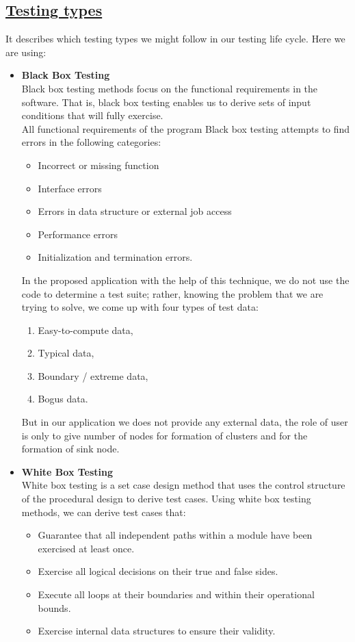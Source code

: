 \subsection*{\underline{Testing types}}
It describes which testing types we might follow in our testing life cycle. Here we are using:
\begin{itemize}
\item \textbf{Black Box Testing}\\
Black box testing methods focus on the functional requirements in the software. That is, black box testing enables us to derive sets of input conditions that will fully exercise.\\
All functional requirements of the program Black box testing attempts to find errors in the following categories:
\begin{itemize}
\item Incorrect or missing function
\item	Interface errors
\item	Errors in data structure or external job access
\item	Performance errors
\item	Initialization and termination errors.
 
\end{itemize}

In the proposed application with the help of this technique, we do not use the code to determine a test suite; rather, knowing the problem that we are trying to solve, we come up with four types of test data: 
\begin{enumerate}
\item	Easy-to-compute data,
\item	Typical data,
\item	Boundary / extreme data,
\item	Bogus data.

\end{enumerate}
But in our application we does not provide any external data, the role of user is only to give number of nodes for formation of clusters and for the formation of sink node.


\item \textbf{White Box Testing}\\
White box testing is a set case design method that uses the control structure of the procedural design to derive test cases. Using white box testing methods, we can derive test cases that:
\begin{itemize}
\item 	Guarantee that all independent paths within a module have been exercised at least once.
\item	Exercise all logical decisions on their true and false sides.
\item	Execute all loops at their boundaries and within their operational bounds.
\item	Exercise internal data structures to ensure their validity.


\end{itemize}
\end{itemize}
